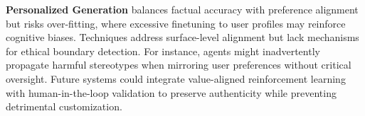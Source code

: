 \textbf{Personalized Generation} balances factual accuracy with preference alignment but risks over-fitting, where excessive finetuning to user profiles may reinforce cognitive biases. Techniques address surface-level alignment but lack mechanisms for ethical boundary detection. For instance, agents might inadvertently propagate harmful stereotypes when mirroring user preferences without critical oversight. Future systems could integrate value-aligned reinforcement learning with human-in-the-loop validation to preserve authenticity while preventing detrimental customization.

